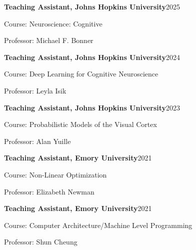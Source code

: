 \documentclass[10pt,letterpaper]{article}
\newcommand{\entry}[2]{\textbf{#1}\hfill #2\par}
\begin{document}
\entry{Teaching Assistant, Johns Hopkins University}{2025}
Course: Neuroscience: Cognitive\par
Professor: Michael F. Bonner\par
\vspace{8pt}

\entry{Teaching Assistant, Johns Hopkins University}{2024}
Course: Deep Learning for Cognitive Neuroscience\par
Professor: Leyla Isik\par
\vspace{8pt}

\entry{Teaching Assistant, Johns Hopkins University}{2023}
Course: Probabilistic Models of the Visual Cortex\par
Professor: Alan Yuille\par
\vspace{8pt}

\entry{Teaching Assistant, Emory University}{2021}
Course: Non-Linear Optimization\par
Professor: Elizabeth Newman\par
\vspace{8pt}

\entry{Teaching Assistant, Emory University}{2021}
Course: Computer Architecture/Machine Level Programming\par
Professor: Shun Cheung\par
\end{document}
